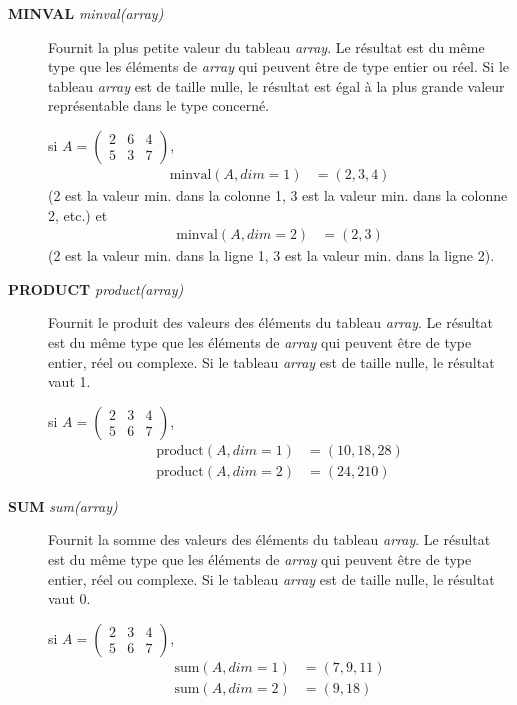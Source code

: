\documentclass[a4paper,twoside]{article}
\begin{document}
\begin{description}
\item[\textbf{MINVAL} \emph{minval(array)}] Fournit la plus petite valeur du tableau \emph{array}. Le résultat est du même type que les éléments de \emph{array} qui peuvent être de type entier ou réel. Si le tableau \emph{array} est de taille nulle, le résultat est égal à la plus grande valeur représentable dans le type concerné. 
\begin{exemple}
si $A=\left(
\begin{array}{ccc}
    2 & 6 & 4  \\
    5 & 3 & 7
\end{array}\right)$, 
\begin{align}
\mathrm{minval}(A,dim=1)  &= (2,3,4)
\end{align}
(2 est la valeur min. dans la colonne 1, 3 est la valeur min. dans la colonne 2, etc.) et 
\begin{align}
\mathrm{minval}(A,dim=2)  &= (2,3)
\end{align}
(2 est la valeur min. dans la ligne 1, 3 est la valeur min. dans la ligne 2).
\end{exemple}

\item[\textbf{PRODUCT} \emph{product(array)}] Fournit le produit des  valeurs des éléments du tableau \emph{array}. Le résultat est du même type que les éléments de \emph{array} qui peuvent être de type entier, réel ou complexe. Si le tableau \emph{array} est de taille nulle, le résultat vaut 1. 
\begin{exemple}
si $A=\left(
\begin{array}{ccc}
    2 & 3 & 4  \\
    5 & 6 & 7
\end{array}\right)$, 
\begin{align}
\mathrm{product}(A,dim=1)  &= (10,18,28)\\
\mathrm{product}(A,dim=2)  &= (24,210)
\end{align}
\end{exemple}

\item[\textbf{SUM} \emph{sum(array)}] Fournit la somme des  valeurs des éléments du tableau \emph{array}. Le résultat est du même type que les éléments de \emph{array} qui peuvent être de type entier, réel ou complexe. Si le tableau \emph{array} est de taille nulle, le résultat vaut 0. 
\begin{exemple}
si $A=\left(
\begin{array}{ccc}
    2 & 3 & 4  \\
    5 & 6 & 7
\end{array}\right)$, 
\begin{align}
\mathrm{sum}(A,dim=1)  &= (7,9,11)\\
\mathrm{sum}(A,dim=2)  &= (9,18)
\end{align}
\end{exemple}


\end{description}
\end{document}
